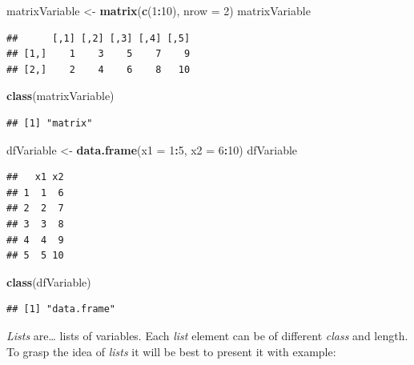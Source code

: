 \documentclass[]{book}
\newenvironment{Shaded}{\begin{snugshade}}{\end{snugshade}}
\newcommand{\KeywordTok}[1]{\textcolor[rgb]{0.13,0.29,0.53}{\textbf{#1}}}
\newcommand{\DataTypeTok}[1]{\textcolor[rgb]{0.13,0.29,0.53}{#1}}
\newcommand{\DecValTok}[1]{\textcolor[rgb]{0.00,0.00,0.81}{#1}}
\newcommand{\StringTok}[1]{\textcolor[rgb]{0.31,0.60,0.02}{#1}}
\newcommand{\OperatorTok}[1]{\textcolor[rgb]{0.81,0.36,0.00}{\textbf{#1}}}
\newcommand{\NormalTok}[1]{#1}
\theoremstyle{definition}
\theoremstyle{definition}
\theoremstyle{definition}
\theoremstyle{remark}
\begin{document}
\begin{Shaded}
\begin{Highlighting}[]
\NormalTok{matrixVariable <-}\StringTok{ }\KeywordTok{matrix}\NormalTok{(}\KeywordTok{c}\NormalTok{(}\DecValTok{1}\OperatorTok{:}\DecValTok{10}\NormalTok{), }\DataTypeTok{nrow =} \DecValTok{2}\NormalTok{)}
\NormalTok{matrixVariable}
\end{Highlighting}
\end{Shaded}

\begin{verbatim}
##      [,1] [,2] [,3] [,4] [,5]
## [1,]    1    3    5    7    9
## [2,]    2    4    6    8   10
\end{verbatim}

\begin{Shaded}
\begin{Highlighting}[]
\KeywordTok{class}\NormalTok{(matrixVariable)}
\end{Highlighting}
\end{Shaded}

\begin{verbatim}
## [1] "matrix"
\end{verbatim}

\begin{Shaded}
\begin{Highlighting}[]
\NormalTok{dfVariable <-}\StringTok{ }\KeywordTok{data.frame}\NormalTok{(}\DataTypeTok{x1 =} \DecValTok{1}\OperatorTok{:}\DecValTok{5}\NormalTok{, }\DataTypeTok{x2 =} \DecValTok{6}\OperatorTok{:}\DecValTok{10}\NormalTok{)}
\NormalTok{dfVariable}
\end{Highlighting}
\end{Shaded}

\begin{verbatim}
##   x1 x2
## 1  1  6
## 2  2  7
## 3  3  8
## 4  4  9
## 5  5 10
\end{verbatim}

\begin{Shaded}
\begin{Highlighting}[]
\KeywordTok{class}\NormalTok{(dfVariable)}
\end{Highlighting}
\end{Shaded}

\begin{verbatim}
## [1] "data.frame"
\end{verbatim}

\emph{Lists} are\ldots{} lists of variables. Each \emph{list} element
can be of different \emph{class} and length. To grasp the idea of
\emph{lists} it will be best to present it with example:
\end{document}
